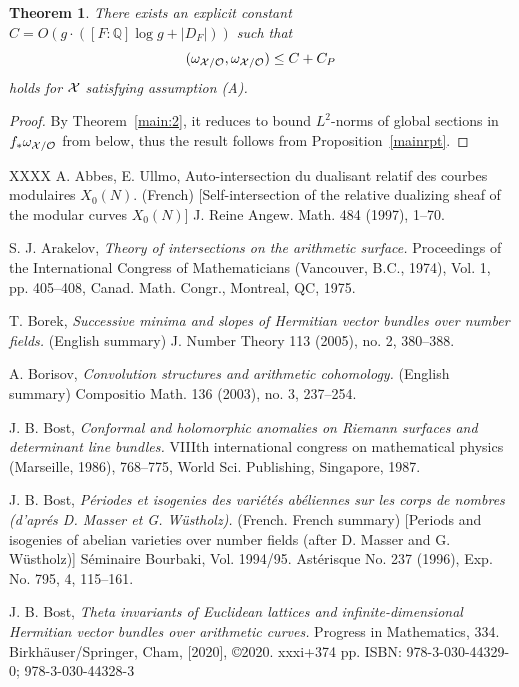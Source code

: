 \documentclass[]{amsart}
\newcommand{\BQ}{{\mathbb {Q}}} \newcommand{\BR}{{\mathbb {R}}}
\newcommand{\CO}{{\mathcal {O}}} \newcommand{\CP}{{\mathcal {P}}}
\theoremstyle{plain}
\newtheorem{thm}{Theorem}[section] \newtheorem{cor}[thm]{Corollary}
\theoremstyle{remark} \newtheorem{remark}[thm]{Remark}
\theoremstyle{remark} \newtheorem{exercise}{Exercise}
\theoremstyle{remark} \newtheorem{example}{Example}
\numberwithin{equation}{section}
\begin{document}
\begin{thm}\label{uppself1}
  There exists an explicit constant 
$C=O(g\cdot([F:\BQ]\log g +|D_F|))
$ such that 
\[(\omega_{\CX/\CO},\omega_{\CX/\CO})\leq C+C_{P}\]holds for ${\mathcal {X}}$ satisfying assumption (A). 
\end{thm}
\begin{proof}
By Theorem~\ref{main:2}, it reduces to bound $L^2$-norms of global sections in $f_{*}\omega_{\CX/\CO}$ from below, thus the result follows from Proposition~\ref{mainrpt}.
\end{proof}
\begin{thebibliography}{XXXX}
A. Abbes, E. Ullmo, {Auto-intersection du dualisant relatif des courbes modulaires $X_0(N)$.} (French) [Self-intersection of the relative dualizing sheaf of the modular curves $X_0(N)$]
J. Reine Angew. Math. 484 (1997), 1--70.

 S. J. Arakelov, {\em Theory of intersections on the arithmetic surface.} Proceedings of the International Congress of Mathematicians (Vancouver, B.C., 1974), Vol. 1, pp. 405--408, Canad. Math. Congr., Montreal, QC, 1975.

 T. Borek, {\em 
Successive minima and slopes of Hermitian vector bundles over number fields.} (English summary)
J. Number Theory 113 (2005), no. 2, 380--388.

A. Borisov, {\em
Convolution structures and arithmetic cohomology.} (English summary)
Compositio Math. 136 (2003), no. 3, 237--254.


 J. B. Bost, {\em Conformal and holomorphic anomalies on Riemann surfaces and determinant line bundles.} VIIIth international congress on mathematical physics (Marseille, 1986), 768--775, World Sci. Publishing, Singapore, 1987. 

J. B. Bost, {\em 
P\'{e}riodes et isogenies des vari\'{e}t\'{e}s ab\'{e}liennes sur les corps de nombres (d'apr\'{e}s D. Masser et G. Wüstholz). }(French. French summary) [Periods and isogenies of abelian varieties over number fields (after D. Masser and G. Wüstholz)]
S\'{e}minaire Bourbaki, Vol. 1994/95.
Ast\'{e}risque No. 237 (1996), Exp. No. 795, 4, 115–161.

J. B. Bost, {\em Theta invariants of Euclidean lattices and infinite-dimensional Hermitian vector bundles over arithmetic curves.}
Progress in Mathematics, 334. Birkhäuser/Springer, Cham, [2020], ©2020. xxxi+374 pp. ISBN: 978-3-030-44329-0; 978-3-030-44328-3


\end{thebibliography}
\end{document}
